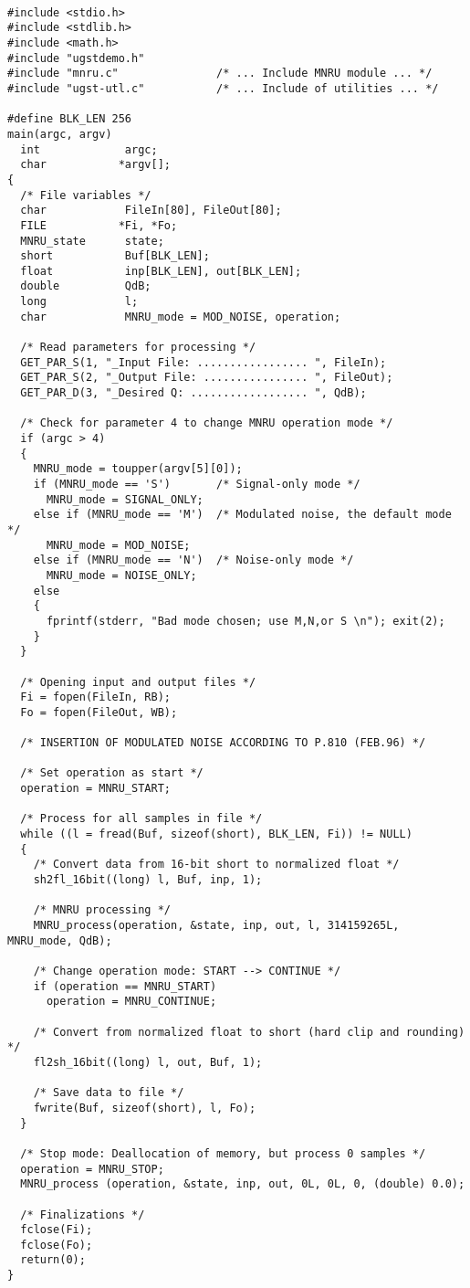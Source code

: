 {\tt\small
\begin{verbatim}
#include <stdio.h>
#include <stdlib.h>
#include <math.h>
#include "ugstdemo.h"
#include "mnru.c"               /* ... Include MNRU module ... */
#include "ugst-utl.c"           /* ... Include of utilities ... */

#define BLK_LEN 256
main(argc, argv)
  int             argc;
  char           *argv[];
{
  /* File variables */
  char            FileIn[80], FileOut[80];
  FILE           *Fi, *Fo;
  MNRU_state      state;
  short           Buf[BLK_LEN];
  float           inp[BLK_LEN], out[BLK_LEN];
  double          QdB;
  long            l;
  char            MNRU_mode = MOD_NOISE, operation;

  /* Read parameters for processing */
  GET_PAR_S(1, "_Input File: ................. ", FileIn);
  GET_PAR_S(2, "_Output File: ................ ", FileOut);
  GET_PAR_D(3, "_Desired Q: .................. ", QdB);

  /* Check for parameter 4 to change MNRU operation mode */
  if (argc > 4)
  {
    MNRU_mode = toupper(argv[5][0]);
    if (MNRU_mode == 'S')       /* Signal-only mode */
      MNRU_mode = SIGNAL_ONLY;
    else if (MNRU_mode == 'M')  /* Modulated noise, the default mode */
      MNRU_mode = MOD_NOISE;
    else if (MNRU_mode == 'N')  /* Noise-only mode */
      MNRU_mode = NOISE_ONLY;
    else
    {
      fprintf(stderr, "Bad mode chosen; use M,N,or S \n"); exit(2);
    }
  }

  /* Opening input and output files */
  Fi = fopen(FileIn, RB);
  Fo = fopen(FileOut, WB);

  /* INSERTION OF MODULATED NOISE ACCORDING TO P.810 (FEB.96) */

  /* Set operation as start */
  operation = MNRU_START;

  /* Process for all samples in file */
  while ((l = fread(Buf, sizeof(short), BLK_LEN, Fi)) != NULL)
  {
    /* Convert data from 16-bit short to normalized float */
    sh2fl_16bit((long) l, Buf, inp, 1);

    /* MNRU processing */
    MNRU_process(operation, &state, inp, out, l, 314159265L, MNRU_mode, QdB);

    /* Change operation mode: START --> CONTINUE */
    if (operation == MNRU_START)
      operation = MNRU_CONTINUE;

    /* Convert from normalized float to short (hard clip and rounding) */
    fl2sh_16bit((long) l, out, Buf, 1);

    /* Save data to file */
    fwrite(Buf, sizeof(short), l, Fo);
  }

  /* Stop mode: Deallocation of memory, but process 0 samples */
  operation = MNRU_STOP;
  MNRU_process (operation, &state, inp, out, 0L, 0L, 0, (double) 0.0);

  /* Finalizations */
  fclose(Fi);
  fclose(Fo);
  return(0);
}

\end{verbatim}
}

